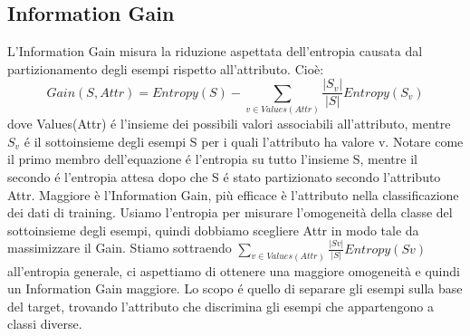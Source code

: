 \documentclass{article}
\begin{document}
\subsection{Information Gain}
L'Information Gain misura la riduzione aspettata dell'entropia causata dal partizionamento degli esempi rispetto all'attributo. Cioè: 
\begin{equation}
    Gain(S,Attr)=Entropy(S)-\sum_{v \in Values(Attr)}\frac{|S_v|}{|S|}Entropy(S_v)
\end{equation}
dove Values(Attr) é l'insieme dei possibili valori associabili all'attributo, mentre $S_v$ é il sottoinsieme degli esempi S per i quali l'attributo ha valore v. \newline 
Notare come il primo membro dell'equazione é l'entropia su tutto l'insieme S, mentre il secondo é l'entropia attesa dopo che S é stato partizionato secondo l'attributo Attr.
Maggiore è l'Information Gain, più efficace è l'attributo nella classificazione dei dati di training. Usiamo l'entropia per misurare l'omogeneità della classe del sottoinsieme degli esempi, quindi dobbiamo scegliere Attr in modo tale da massimizzare il Gain. Stiamo sottraendo $\sum_{v \in Values(Attr)}\frac{|Sv|}{|S|}Entropy(Sv)$ all'entropia generale, ci aspettiamo di ottenere una maggiore omogeneità e quindi un Information Gain maggiore. Lo scopo é quello di separare gli esempi sulla base del target, trovando l'attributo che discrimina gli esempi che appartengono a classi diverse.
\end{document}
